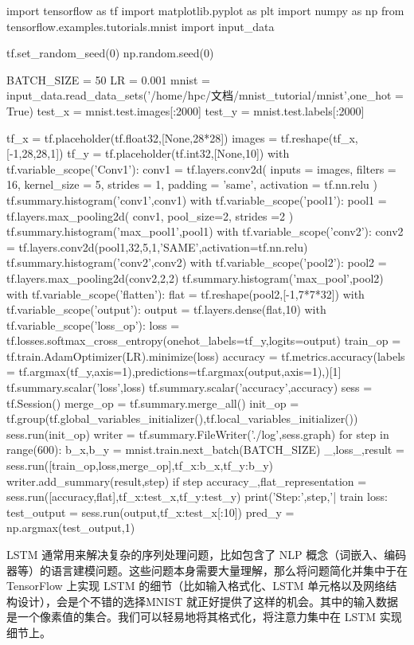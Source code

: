 \begin{python}
import tensorflow as tf
import matplotlib.pyplot as plt
import numpy as np
from tensorflow.examples.tutorials.mnist import input_data

tf.set_random_seed(0)
np.random.seed(0)

BATCH_SIZE = 50
LR = 0.001
mnist = input_data.read_data_sets('/home/hpc/文档/mnist_tutorial/mnist',one_hot = True)
test_x = mnist.test.images[:2000]
test_y = mnist.test.labels[:2000]

tf_x = tf.placeholder(tf.float32,[None,28*28])
images = tf.reshape(tf_x,[-1,28,28,1])
tf_y = tf.placeholder(tf.int32,[None,10])
with tf.variable_scope('Conv1'):
    conv1 = tf.layers.conv2d(
            inputs = images,
            filters = 16,
            kernel_size = 5,
            strides = 1,
            padding = 'same',
            activation = tf.nn.relu
        )
    tf.summary.histogram('conv1',conv1)
with tf.variable_scope('pool1'):
    pool1 = tf.layers.max_pooling2d(
            conv1,
            pool_size=2,
            strides =2
        )
    tf.summary.histogram('max_pool1',pool1)
with tf.variable_scope('conv2'):
    conv2 = tf.layers.conv2d(pool1,32,5,1,'SAME',activation=tf.nn.relu)
    tf.summary.histogram('conv2',conv2)
with tf.variable_scope('pool2'):
    pool2 = tf.layers.max_pooling2d(conv2,2,2)
    tf.summary.histogram('max_pool',pool2)
with tf.variable_scope('flatten'):
    flat = tf.reshape(pool2,[-1,7*7*32])
with tf.variable_scope('output'):
    output = tf.layers.dense(flat,10)
with tf.variable_scope('loss_op'):
    loss = tf.losses.softmax_cross_entropy(onehot_labels=tf_y,logits=output)
    train_op = tf.train.AdamOptimizer(LR).minimize(loss)
    accuracy = tf.metrics.accuracy(labels = tf.argmax(tf_y,axis=1),predictions=tf.argmax(output,axis=1),)[1]
    tf.summary.scalar('loss',loss)
    tf.summary.scalar('accuracy',accuracy)
sess = tf.Session()
merge_op = tf.summary.merge_all()
init_op = tf.group(tf.global_variables_initializer(),tf.local_variables_initializer())
sess.run(init_op)
writer = tf.summary.FileWriter('./log',sess.graph)
for step in range(600):
    b_x,b_y = mnist.train.next_batch(BATCH_SIZE)
    _,loss_,result = sess.run([train_op,loss,merge_op],{tf_x:b_x,tf_y:b_y})
    writer.add_summary(result,step)
    if step%
        accuracy_,flat_representation = sess.run([accuracy,flat],{tf_x:test_x,tf_y:test_y})
        print('Step:',step,'| train loss:%
test_output = sess.run(output,{tf_x:test_x[:10]})
pred_y = np.argmax(test_output,1)
\end{python}
LSTM 通常用来解决复杂的序列处理问题，比如包含了 NLP 概念（词嵌入、编码器等）的语言建模问题。这些问题本身需要大量理解，那么将问题简化并集中于在 TensorFlow 上实现 LSTM 的细节（比如输入格式化、LSTM 单元格以及网络结构设计），会是个不错的选择MNIST 就正好提供了这样的机会。其中的输入数据是一个像素值的集合。我们可以轻易地将其格式化，将注意力集中在 LSTM 实现细节上。

